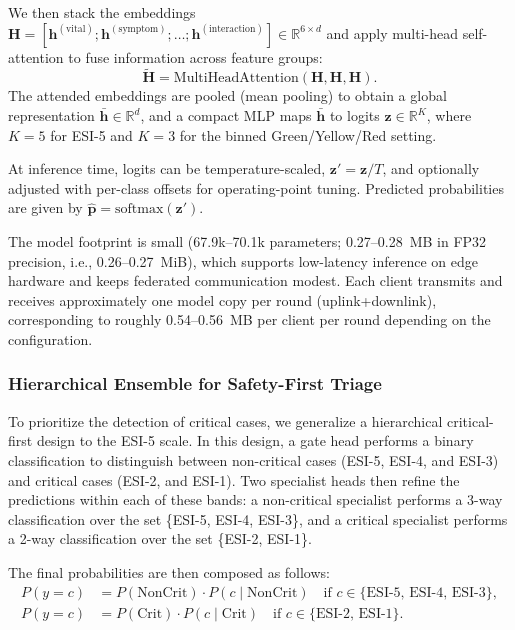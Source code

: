 \documentclass[journal,article,submit,pdftex,moreauthors]{Definitions/mdpi}
\begin{document}
We then stack the embeddings $\mathbf{H} = [\mathbf{h}^{(\text{vital})}; \mathbf{h}^{(\text{symptom})}; \dots; \mathbf{h}^{(\text{interaction})}] \in \mathbb{R}^{6 \times d}$ and apply multi-head self-attention to fuse information across feature groups:
\begin{equation}
\tilde{\mathbf{H}} = \text{MultiHeadAttention}(\mathbf{H}, \mathbf{H}, \mathbf{H}).
\end{equation}
The attended embeddings are pooled (mean pooling) to obtain a global representation $\bar{\mathbf{h}} \in \mathbb{R}^{d}$, and a compact MLP maps $\bar{\mathbf{h}}$ to logits $\mathbf{z} \in \mathbb{R}^{K}$, where $K=5$ for ESI-5 and $K=3$ for the binned Green/Yellow/Red setting.

At inference time, logits can be temperature-scaled, $\mathbf{z}' = \mathbf{z}/T$, and optionally adjusted with per-class offsets for operating-point tuning. Predicted probabilities are given by $\hat{\mathbf{p}} = \text{softmax}(\mathbf{z}')$.

The model footprint is small (67.9k--70.1k parameters; 0.27--0.28~MB in FP32 precision, i.e., 0.26--0.27~MiB), which supports low-latency inference on edge hardware and keeps federated communication modest. Each client transmits and receives approximately one model copy per round (uplink+downlink), corresponding to roughly 0.54--0.56~MB per client per round depending on the configuration.

\subsubsection{Hierarchical Ensemble for Safety-First Triage}

To prioritize the detection of critical cases, we generalize a hierarchical critical-first design to the ESI-5 scale. In this design, a gate head performs a binary classification to distinguish between non-critical cases (ESI-5, ESI-4, and ESI-3) and critical cases (ESI-2, and ESI-1). Two specialist heads then refine the predictions within each of these bands: a non-critical specialist performs a 3-way classification over the set \{ESI-5, ESI-4, ESI-3\}, and a critical specialist performs a 2-way classification over the set \{ESI-2, ESI-1\}.

The final probabilities are then composed as follows:
\begin{align}
P(y = c) &= P(\text{NonCrit}) \cdot P(c \mid \text{NonCrit}) \quad \text{if } c \in \{\text{ESI-5, ESI-4, ESI-3}\}, \\
P(y = c) &= P(\text{Crit}) \cdot P(c \mid \text{Crit}) \quad \text{if } c \in \{\text{ESI-2, ESI-1}\}.
\end{align}
\end{document}
